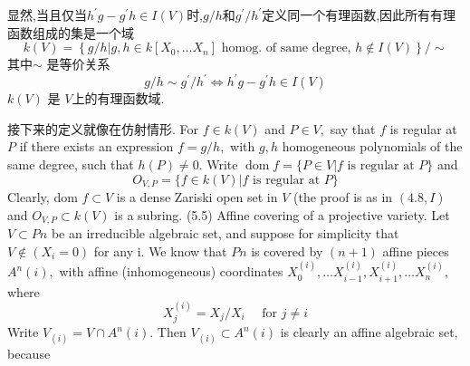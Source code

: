 \documentclass[UTF8]{book}
\begin{document}
		
		显然,当且仅当$h ^{\prime} g - g ^{\prime} h \in I ( V )$时,$g / h$和$g ^{\prime} / h ^{\prime}$定义同一个有理函数,因此所有有理函数组成的集是一个域
		\begin{equation*}
		k ( V )=\left\{ g / h | g , h \in k \left[ X _{0}, \ldots X _{ n }\right] \text { homog. of same degree, } h \notin I ( V )\right\} / \sim
		\end{equation*}
		其中$\sim$ 是等价关系
		\begin{equation*}
		g / h \sim g ^{\prime} / h ^{\prime} \Longleftrightarrow h ^{\prime} g - g ^{\prime} h \in I ( V )
		\end{equation*}
		$k ( V )$ 是 $V$上的有理函数域. 
		
		
		接下来的定义就像在仿射情形. For $f \in k ( V )$ and $P \in V ,$ say that $f$ is regular at $P$ if there exists an expression $f = g / h ,$ with $g , h$ homogeneous polynomials of the same degree, such that $h ( P ) \neq 0 .$ Write
		$\operatorname{dom} f =\{ P \in V | f \text { is regular at } P \}$
		and
		\begin{equation*}
		O _{ V , P }=\{ f \in k ( V ) | f \text { is regular at } P \}
		\end{equation*}
		Clearly, dom $f \subset V$ is a dense Zariski open set in $V$ (the proof is as in $(4.8, I )$ and $O _{ V , P } \subset k ( V )$ is a subring.
		(5.5) Affine covering of a projective variety. Let $V \subset P n$ be an irreducible algebraic set, and suppose for simplicity that $V \notin\left(X_{i}=0\right)$ for any i. We know that $P n$ is covered by $( n +1)$ affine pieces $A ^{ n }( i ),$ with affine (inhomogeneous) coordinates $X _{0}^{( i )}, \ldots X _{ i -1}^{( i )}, X _{ i +1}^{( i )}, \ldots X _{ n }^{( i )},$ where
		\begin{equation*}
		X _{ j }^{( i )}= X _{ j } / X _{ i } \quad \text { for } j \neq i
		\end{equation*}
		Write $V_{(i)}=V \cap A^{n}(i) .$ Then $V_{(i)} \subset A^{n}(i)$ is clearly an affine algebraic set, because
		
\end{document}
